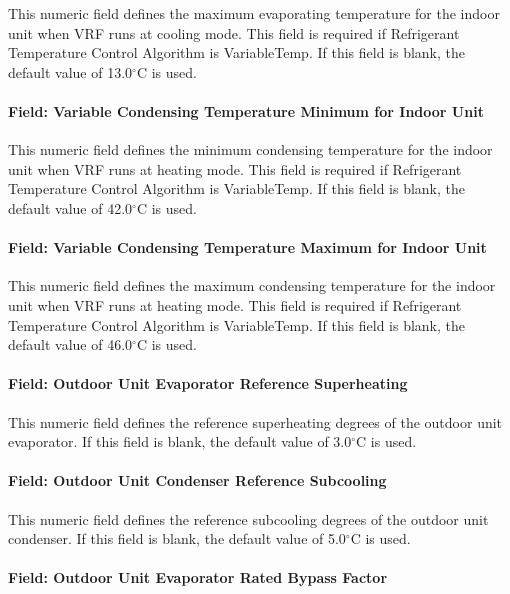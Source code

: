 This numeric field defines the maximum evaporating temperature for the indoor unit when VRF runs at cooling mode. This field is required if Refrigerant Temperature Control Algorithm is VariableTemp. If this field is blank, the default value of 13.0$^\circ$C is used.

\paragraph{Field: Variable Condensing Temperature Minimum for Indoor Unit}

This numeric field defines the minimum condensing temperature for the indoor unit when VRF runs at heating mode. This field is required if Refrigerant Temperature Control Algorithm is VariableTemp. If this field is blank, the default value of 42.0$^\circ$C is used.

\paragraph{Field: Variable Condensing Temperature Maximum for Indoor Unit}

This numeric field defines the maximum condensing temperature for the indoor unit when VRF runs at heating mode. This field is required if Refrigerant Temperature Control Algorithm is VariableTemp. If this field is blank, the default value of 46.0$^\circ$C is used.

\paragraph{Field: Outdoor Unit Evaporator Reference Superheating}

This numeric field defines the reference superheating degrees of the outdoor unit evaporator. If this field is blank, the default value of 3.0$^\circ$C is used.

\paragraph{Field: Outdoor Unit Condenser Reference Subcooling}

This numeric field defines the reference subcooling degrees of the outdoor unit condenser. If this field is blank, the default value of 5.0$^\circ$C is used.

\paragraph{Field: Outdoor Unit Evaporator Rated Bypass Factor}

